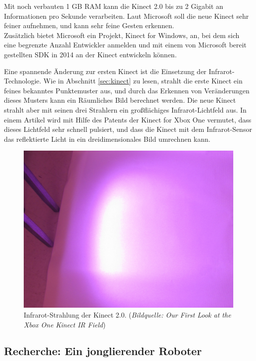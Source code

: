 \documentclass[12pt,a4paper,ngerman]{scrartcl}
\begin{document}
Mit noch verbauten 1 GB RAM kann die Kinect 2.0 bis zu 2 Gigabit an Informationen pro Sekunde verarbeiten. Laut Microsoft soll die neue Kinect sehr feiner aufnehmen, und kann sehr feine Gesten erkennen.\\
Zusätzlich bietet Microsoft ein Projekt, Kinect for Windows, an, bei dem sich eine begrenzte Anzahl Entwickler anmelden und mit einem von Microsoft bereit gestellten SDK in 2014 an der Kinect entwickeln können.\cite{kinect2:forwindows}

Eine spannende Änderung zur ersten Kinect ist die Einsetzung der Infrarot-Technologie. Wie in Abschnitt \ref{sec:kinect} zu lesen, strahlt die erste Kinect ein feines bekanntes Punktemuster aus, und durch das Erkennen von Veränderungen dieses Musters kann ein Räumliches Bild berechnet werden. Die neue Kinect strahlt aber mit seinen drei Strahlern ein großflächiges Infrarot-Lichtfeld aus. In einem Artikel wird mit Hilfe des Patents der Kinect for Xbox One vermutet, dass dieses Lichtfeld sehr schnell pulsiert, und dass die Kinect mit dem Infrarot-Sensor das reflektierte Licht in ein dreidimensionales Bild umrechnen kann.\cite{kinect2:infrared}

\begin{figure}[H]
    \centering
    \includegraphics[scale=0.33]{img/kinect2_infrared.jpg}
    \caption{Infrarot-Strahlung der Kinect 2.0. ({\em Bildquelle: Our First Look at the Xbox One Kinect IR Field\cite{kinect2:infrared}})}
\end{figure}

\subsection{Recherche: Ein jonglierender Roboter}
\end{document}
